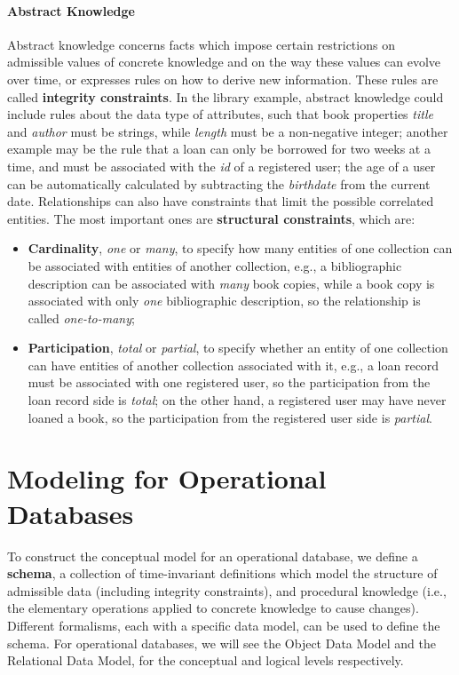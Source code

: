 \paragraph{Abstract Knowledge} Abstract knowledge concerns facts which impose certain restrictions on admissible values of concrete knowledge and on the way these values can evolve over time, or expresses rules on how to derive new information. These rules are called \textbf{integrity constraints}. In the library example, abstract knowledge could include rules about the data type of attributes, such that book properties \textit{title} and \textit{author} must be strings, while \textit{length} must be a non-negative integer; another example may be the rule that a loan can only be borrowed for two weeks at a time, and must be associated with the \textit{id} of a registered user; the age of a user can be automatically calculated by subtracting the \textit{birthdate} from the current date. Relationships can also have constraints that limit the possible correlated entities. The most important ones are \textbf{structural constraints}, which are:
\begin{itemize}
    \item \textbf{Cardinality}, \textit{one} or \textit{many}, to specify how many entities of one collection can be associated with entities of another collection, e.g., a bibliographic description can be associated with \textit{many} book copies, while a book copy is associated with only \textit{one} bibliographic description, so the relationship is called \textit{one-to-many};
    \item \textbf{Participation}, \textit{total} or \textit{partial}, to specify whether an entity of one collection can have entities of another collection associated with it, e.g., a loan record must be associated with one registered user, so the participation from the loan record side is \textit{total}; on the other hand, a registered user may have never loaned a book, so the participation from the registered user side is \textit{partial}. 
\end{itemize}

\section{Modeling for Operational Databases}

To construct the conceptual model for an operational database, we define a \textbf{schema}, a collection of time-invariant definitions which model the structure of admissible data (including integrity constraints), and procedural knowledge (i.e., the elementary operations applied to concrete knowledge to cause changes). Different formalisms, each with a specific data model, can be used to define the schema.
For operational databases, we will see the Object Data Model and the Relational Data Model, for the conceptual and logical levels respectively.

